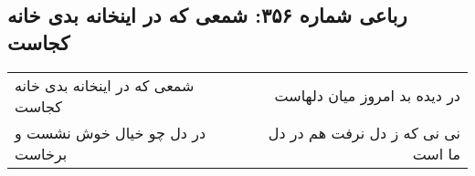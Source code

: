 \begin{center}
\section*{رباعی شماره ۳۵۶: شمعی که در اینخانه بدی خانه کجاست}
\label{sec:0356}
\begin{longtable}{l p{0.5cm} r}
شمعی که در اینخانه بدی خانه کجاست
&&
در دیده بد امروز میان دلهاست
\\
در دل چو خیال خوش نشست و برخاست
&&
نی نی که ز دل نرفت هم در دل ما است
\\
\end{longtable}
\end{center}
